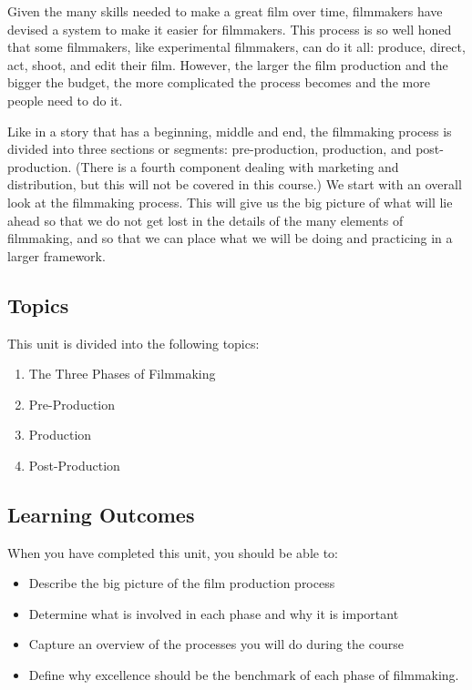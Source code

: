 \documentclass[
]{book}
\providecommand{\tightlist}{%
  \setlength{\itemsep}{0pt}\setlength{\parskip}{0pt}}
\begin{document}
Given the many skills needed to make a great film over time, filmmakers have devised a system to make it easier for filmmakers. This process is so well honed that some filmmakers, like experimental filmmakers, can do it all: produce, direct, act, shoot, and edit their film. However, the larger the film production and the bigger the budget, the more complicated the process becomes and the more people need to do it.

Like in a story that has a beginning, middle and end, the filmmaking process is divided into three sections or segments: pre-production, production, and post-production. (There is a fourth component dealing with marketing and distribution, but this will not be covered in this course.) We start with an overall look at the filmmaking process. This will give us the big picture of what will lie ahead so that we do not get lost in the details of the many elements of filmmaking, and so that we can place what we will be doing and practicing in a larger framework.

\hypertarget{topics-1}{%
\subsection*{Topics}\label{topics-1}}

This unit is divided into the following topics:

\begin{enumerate}
\def\labelenumi{\arabic{enumi}.}
\tightlist
\item
  The Three Phases of Filmmaking\\
\item
  Pre-Production\\
\item
  Production\\
\item
  Post-Production
\end{enumerate}

\hypertarget{learning-outcomes-1}{%
\subsection*{Learning Outcomes}\label{learning-outcomes-1}}

When you have completed this unit, you should be able to:

\begin{itemize}
\item
  Describe the big picture of the film production process
\item
  Determine what is involved in each phase and why it is important
\item
  Capture an overview of the processes you will do during the course
\item
  Define why excellence should be the benchmark of each phase of filmmaking.
\end{itemize}
\end{document}
